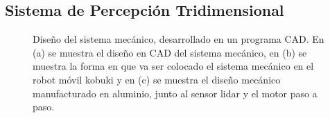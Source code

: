 \subsection{Sistema de Percepción Tridimensional}
\label{sec:SistP3D}
\begin{figure}[ht!]
     \begin{center}
    \end{center}
  \captionsetup{font=footnotesize}
    \caption{\label{f:lidar3D}Diseño del sistema mecánico, desarrollado en un programa CAD. En (a) se 
    muestra el diseño en CAD del sistema mecánico, en (b) se muestra la forma en que va ser colocado 
    el sistema mecánico en el robot móvil kobuki y en (c) se muestra el diseño mecánico manufacturado 
    en aluminio, junto al sensor lidar y el motor paso a paso.}
\end{figure}

